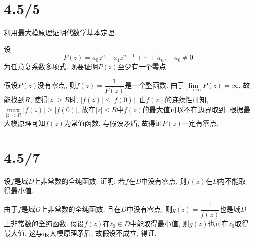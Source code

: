 \documentclass[11pt,a4paper]{article}
\begin{document}
\section{4.5/5}
\begin{problem}
利用最大模原理证明代数学基本定理.
\end{problem}
设
$$P(z)=a_0z^n+a_1z^{n-1}+\cdots+a_n,\quad a_0\neq0$$
为任意复系数多项式. 现要证明$P(z)$至少有一个零点.\medskip

假设$P(z)$没有零点, 则$f(z)=\dfrac{1}{P(z)}$是一个整函数.
由于$\lim\limits_{z\to\infty}P(z)=\infty$, 故能找到$R$, 使得$|z|\geqslant R$时, $|f(z)|\leqslant|f(0)|$. 由$f(z)$的连续性可知, $\max\limits_{|z|<R}|f(z)|\geqslant|f(0)|$, 故在$|z|\leqslant R$中$f(z)$的最大值可以不在边界取到. 根据最大模原理可知$f(z)$为常值函数, 与假设矛盾, 故得证$P(z)$一定有零点.

\section{4.5/7}
\begin{problem}
设$f$是域$D$上非常数的全纯函数. 证明: 若$f$在$D$中没有零点, 则$f(z)$在$D$内不能取得最小值.
\end{problem}
由于$f$是域$D$上非常数的全纯函数, 且在$D$中没有零点, 则$g(z)=\dfrac{1}{f(z)}$也是域$D$上非常数的全纯函数. 假设$f(z)$在$z_0\in D$中能取得最小值, 则$g(z)$也可在$z_0$取得最大值, 这与最大模原理矛盾, 故假设不成立, 得证.
\end{document}
